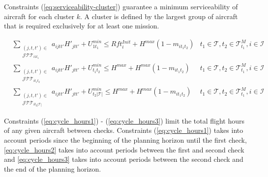 \documentclass[a4paper,onecolumn,fleqn]{article}
\begin{document}
    Constraints (\ref{eq:serviceability-cluster}) guarantee a minimum serviceability of aircraft for each cluster $k$. A cluster is defined by the largest group of aircraft that is required exclusively for at least one mission. 

    \begin{align}
        & \sum_{\substack{(j, t, t') \in \\ \mathcal{J}\mathcal{T}\mathcal{T}_{i1t_1}}} a_{ijtt'} H'_{jtt'} + U^{min}_{1t_1} \leq Rft^{Init}_i + H^{max} (1 - m_{it_1t_2}) 
                & t_1 \in \mathcal{T}, t_2 \in \mathcal{T}^M_{t_1}, i \in \mathcal{I}\label{eq:cycle_hours1}\\
        & \sum_{\substack{(j, t, t') \in \\ \mathcal{J}\mathcal{T}\mathcal{T}_{it_1t_2}}} a_{ijtt'} H'_{jtt'} + U^{min}_{t_1t_2} \leq H^{max} + H^{max} (1 - m_{it_1t_2}) 
                & t_1 \in \mathcal{T}, t_2 \in \mathcal{T}^M_{t_1}, i \in \mathcal{I}\label{eq:cycle_hours2}\\
        & \sum_{\substack{(j, t, t') \in \\ \mathcal{J}\mathcal{T}\mathcal{T}_{it_2|\mathcal{T}|}}} a_{ijtt'} H'_{jtt'} + U^{min}_{t_2|\mathcal{T}|} \leq H^{max} + H^{max} (1 - m_{it_1t_2}) 
                & t_1 \in \mathcal{T}, t_2 \in \mathcal{T}^M_{t_1}, i \in \mathcal{I}\label{eq:cycle_hours3}
    \end{align}

        Constraints (\ref{eq:cycle_hours1}) - (\ref{eq:cycle_hours3}) limit the total flight hours of any given aircraft between checks. Constraints (\ref{eq:cycle_hours1}) takes into account periods since the beginning of the planning horizon until the first check, \ref{eq:cycle_hours2} takes into account periods between the first and second check and \ref{eq:cycle_hours3} takes into account periods between the second check and the end of the planning horizon.
\end{document}
